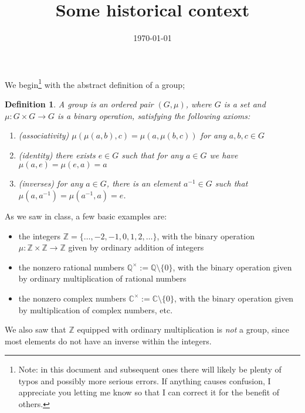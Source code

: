 \documentclass[11pt, reqno]{amsart}
\newtheorem{definition}[thm]{Definition}
\newtheorem{example}[thm]{Example}
\theoremstyle{remark}
\numberwithin{equation}{subsection}
\numberwithin{figure}{section}
\numberwithin{table}{section}
\newcommand{\Z}{\mathbb{Z}}
\newcommand{\Q}{\mathbb{Q}}
\newcommand{\C}{\mathbb{C}}
\begin{document}
\title{Some historical context} 

\date{\today}

\maketitle



We begin\footnote{Note: in this document and subsequent ones there will likely be plenty of typos and possibly more serious errors. If anything causes confusion, I appreciate you letting me know so that I can correct it for the benefit of others.} with the abstract definition of a group;
\begin{definition}
A {\em group} is an ordered pair $(G,\mu)$, where $G$ is a set and $\mu: G \times G \rightarrow G$ is a binary operation, satisfying the following axioms:
\begin{enumerate}
\item (associativity) $\mu(\mu(a,b),c) = \mu(a,\mu(b,c))$ for any $a,b,c \in G$
\item (identity) there exists $e \in G$ such that for any $a \in G$ we have $\mu(a,e) = \mu(e,a) = a$
\item (inverses) for any $a \in G$, there is an element $a^{-1} \in G$ such that $\mu(a,a^{-1}) = \mu(a^{-1},a) = e$.
\end{enumerate}
\end{definition}

As we saw in class, a few basic examples are:
\begin{itemize}
\item the integers $\Z = \{\dots,-2,-1,0,1,2,\dots\}$, with the binary operation $\mu: \Z \times \Z \rightarrow \Z$ given by ordinary addition of integers
\item the nonzero rational numbers $\Q^\times := \Q \setminus \{0\}$, with the binary operation given by ordinary multiplication of rational numbers
\item the nonzero complex numbers $\C^\times := \C \setminus \{0\}$, with the binary operation given by multiplication of complex numbers, etc.
\end{itemize}
We also saw that $\Z$ equipped with ordinary multiplication is {\em not} a group, since most elements do not have an inverse within the integers.
\end{document}
